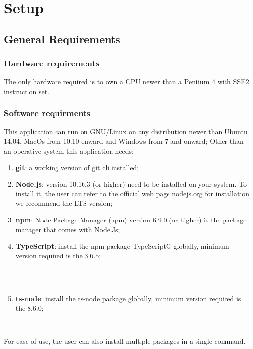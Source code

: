 \section{Setup}
\subsection{General Requirements}
\subsubsection{Hardware requirements}
The only hardware required is to own a CPU newer than a Pentium 4 with SSE2 instruction set.
\subsubsection{Software requirments}
This application can run on GNU/Linux on any distribution newer than Ubuntu 14.04, MacOs from 10.10 onward and Windows from 7 and onward;
Other than an operative system this application needs:
\begin{enumerate}
	\item \textbf{git}: a working version of git cli installed;
    \item \textbf{Node.js}: version 10.16.3 (or higher) need to be installed on your system. To install it, the user can refer to the official web page nodejs.org for installation we recommend the LTS version;
    \item \textbf{npm}: Node Package Manager (npm) version 6.9.0 (or higher) is the package manager that comes with Node.Js;
    \item \textbf{TypeScript}: install the npm package TypeScriptG globally, minimum version required is the 3.6.5;\\\\ \centerline{}\\
    \item \textbf{ts-node}: install the ts-node package globally, minimum version required is the 8.6.0; \newline\newline \centerline{}\\
\end{enumerate}
For ease of use, the user can also install multiple packages in a single command.
\begin{center}
\end{center}

